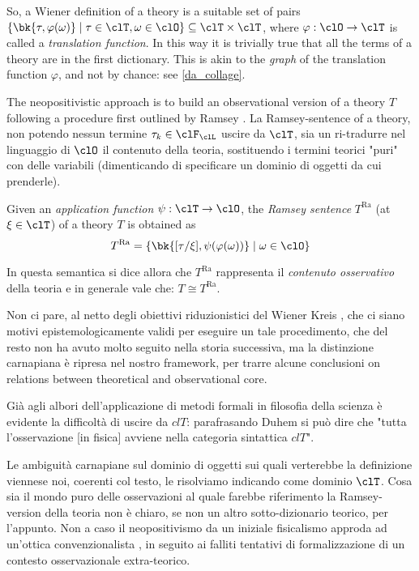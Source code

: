 So, a Wiener definition of a theory is a suitable set of pairs $\{\bk{\tau,\varphi(\omega)} \mid \tau\in\clT, \omega \in\clO\}\subseteq \clT\times\clT$, where $\varphi: \clO \to \clT$ is called a \emph{translation function}. In this way it is trivially true that all the terms of a theory are in the first dictionary. This is akin to the \emph{graph} of the translation function $\varphi$, and not by chance: see \autoref{da_collage}.

The neopositivistic approach is to build an observational version of a theory $T$ following a procedure first outlined by Ramsey \cite{?}. La Ramsey-sentence of a theory, non potendo nessun termine $\tau_k \in \clF_\clL$ uscire da $\clT$, sia un ri-tradurre nel linguaggio di $\clO$ il contenuto della teoria, sostituendo i termini teorici "puri" con delle variabili (dimenticando di specificare un dominio di oggetti da cui prenderle).
\begin{definition} 
	Given an \emph{application function} $\psi: \clT \to \clO$, the \emph{Ramsey sentence} $T^\text{Ra}$ (at $\xi\in\clT$) of a theory $T$ is obtained as  
	\[ 
		T^\text{Ra} = \{\bk{[\tau/\xi], \psi(\varphi (\omega))} \mid \omega\in\clO\} 
	\]
\end{definition}
In questa semantica si dice allora che $T^\text{Ra}$ rappresenta il \emph{contenuto osservativo} della teoria e in generale vale che: $T \cong T^\text{Ra}$. 



Non ci pare, al netto degli obiettivi riduzionistici del Wiener Kreis \cite{}, che ci siano motivi epistemologicamente validi per eseguire un tale procedimento, che del resto non ha avuto molto seguito nella storia successiva, ma la distinzione carnapiana è ripresa nel nostro framework, per trarre alcune conclusioni on relations between theoretical and observational core.

Già agli albori dell'applicazione di metodi formali in filosofia della scienza è evidente la difficoltà di uscire da $clT$: parafrasando Duhem si può dire che "tutta l'osservazione [in fisica] avviene nella categoria sintattica $clT$". 

Le ambiguità carnapiane sul dominio di oggetti sui quali verterebbe la definizione viennese noi, coerenti col testo, le risolviamo indicando come dominio $\clT$. Cosa sia il mondo puro delle osservazioni al quale farebbe riferimento la Ramsey-version della teoria non è chiaro, se non un altro sotto-dizionario teorico, per l'appunto. Non a caso il neopositivismo da un iniziale fisicalismo approda ad un'ottica convenzionalista \cite{?}, in seguito ai falliti tentativi di formalizzazione di un contesto osservazionale extra-teorico. 

